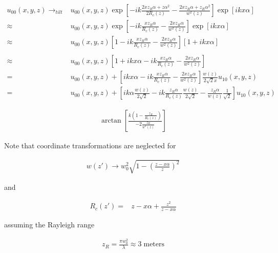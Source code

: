 \documentclass[aps,twoside,secnumarabic,balancelastpage,amsmath,amssymb,nofootinbib,hyperref=pdftex]{revtex4}
\begin{document}
	
	\begin{align*}
		u_{00}(x,y,z) \rightarrow_{tilt} & 
			u_{00}(x,y,z) 			
			\exp 
			\left[ -ik
			\frac{2xz_R \alpha +z\alpha^2}{2R_c(z)}
			-			
			\frac{2xz_R \alpha +z_R\alpha^2}{w^2(z)}			
			\right]
			\exp \left[ ikx\alpha \right]
		\nonumber\\
			\approx & 
			u_{00}(x,y,z) 
			\exp 
			\left[ -ik \frac{xz_R\alpha}{R_c(z)}
			- \frac{2xz_R \alpha}{w^2(z)}
			\right]	
			\exp \left[ i kx\alpha \right]
		\nonumber\\ 
			\approx & 
			u_{00} (x,y,z)
			\left[
			1 
			- ik \frac{xz_R \alpha}{R_c(z)}
			- \frac{2xz_R \alpha}{w^2(z)}
			\right]
			\left[
			1 + i kx\alpha \right]
			\nonumber\\
			\\ \approx &
						u_{00} (x,y,z)
			\left[
			1 
			+ i kx \alpha			
			- ik \frac{xz_R \alpha}{R_c(z)}
			- \frac{2xz_R \alpha}{w^2(z)}
			\right]
			\\= &
									u_{00} (x,y,z)
									+
			\left[
			 i kx \alpha			
			- ik \frac{xz_R \alpha}{R_c(z)}
			- \frac{2xz_R \alpha}{w^2(z)}
			\right]
			 	\frac{w(z)}{2\sqrt{2} x} 
 u_{10}(x,y,z) 
 			\\= &
									u_{00} (x,y,z)
									+
			\left[
			 i k \alpha	\frac{w(z)}{2\sqrt{2} } 		
			- ik \frac{z_R \alpha}{R_c(z)}
			\frac{w(z)}{2\sqrt{2} } 
			- \frac{z_R \alpha}{w(z)}
			\frac{1}{\sqrt{2} } 
			\right]			 	
 u_{10}(x,y,z) 
	\end{align*}

\begin{align*}
\arctan \left[	
	\frac
	{
	 k 
	 (
	 	1		
			- \frac{z_R}{R_c(z)}
	 )
	}
	{	
			- 2\frac{z_R}{w^2(z)}
	}
	\right]
\end{align*}

Note that coordinate transformations are neglected for 

\begin{align*}
	w(z') \rightarrow 
	w_0^2
	\sqrt{1-(
	\frac{z- x\alpha}
	{z} )^2}
\end{align*}

and

\begin{align*}
	R_c(z')
 =&
  z - x \alpha + \frac{z^2}{z - x \alpha}
\end{align*}

assuming the Rayleigh range 

\begin{align*}
	z_R = \frac{\pi w_0^2}{\lambda} \approx 3 \; \mathrm{meters}
\end{align*}
\end{document}
